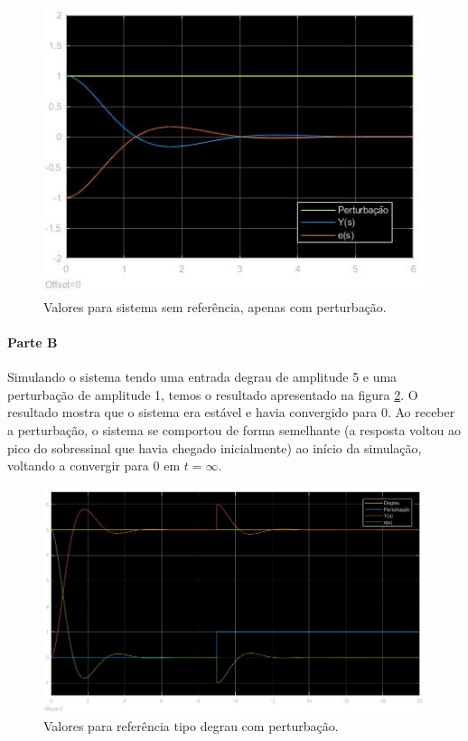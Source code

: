\documentclass[
]{book}
\begin{document}
\begin{figure}
\includegraphics[width=0.8\linewidth]{Imagens/Lab4/Resolução/prob3A1} \caption{Valores para sistema sem referência, apenas com perturbação.}\label{fig:fig43A1}
\end{figure}

\hypertarget{parte-b-2}{%
\paragraph*{Parte B}\label{parte-b-2}}

Simulando o sistema tendo uma entrada degrau de amplitude 5 e uma perturbação de amplitude 1, temos o resultado apresentado na figura \ref{fig:fig43B1}. O resultado mostra que o sistema era estável e havia convergido para 0. Ao receber a perturbação, o sistema se comportou de forma semelhante (a resposta voltou ao pico do sobressinal que havia chegado inicialmente) ao início da simulação, voltando a convergir para 0 em \(t=\infty\).

\begin{figure}
\includegraphics[width=0.8\linewidth]{Imagens/Lab4/Resolução/prob3B1} \caption{Valores para referência tipo degrau com perturbação.}\label{fig:fig43B1}
\end{figure}
\end{document}
